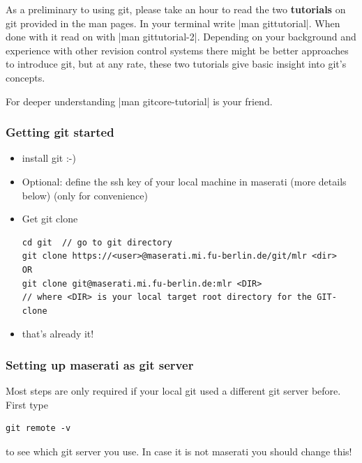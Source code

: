 As a preliminary to using git, please take an hour to read the two
\textbf{tutorials} on git provided in the man pages. In your terminal
write |man gittutorial|. When done with it read on with
|man gittutorial-2|.
Depending on your background and experience with other revision control
systems there might be better approaches to introduce git, but at any
rate, these two tutorials give basic insight into git's concepts.

For deeper understanding |man gitcore-tutorial| is your friend.


\subsubsection{Getting git started}

\begin{itemize}

\item install git :-)

\item Optional: define the ssh key of your local machine in maserati
(more details below) (only for convenience)

\item Get git clone
\begin{code}
\begin{verbatim}
cd git  // go to git directory
git clone https://<user>@maserati.mi.fu-berlin.de/git/mlr <dir>
OR
git clone git@maserati.mi.fu-berlin.de:mlr <DIR>
// where <DIR> is your local target root directory for the GIT-clone
\end{verbatim}
\end{code}

\item that's already it!

\end{itemize}



\subsubsection{Setting up maserati as git server}

Most steps are only required if your local git used a different git
server before.
\\
First type
\begin{verbatim}
git remote -v 
\end{verbatim}
to see which git server you use. In case it is not maserati you should
change this!

